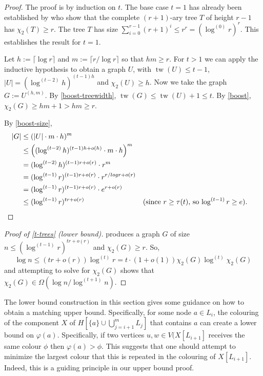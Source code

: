 \documentclass[kpfonts]{patmorin}
\DeclareMathOperator{\tw}{tw}
\newcommand{\trn}{\chi_2}
\theoremstyle{named}
\begin{document}
\begin{proof}
    The proof is by induction on $t$.  The base case $t=1$ has already been established by \citet{karpas.neiman.ea:on} who show that the complete $(r+1)$-ary tree $T$ of height $r-1$ has $\trn(T)\ge r$.  The tree $T$ has size $\sum_{i=0}^{r-1} (r+1)^i \le r^r=(\log^{(0)}r)^{r}$.  This establishes the result for $t=1$.

    Let $h:=\lceil\log r\rceil$ and $m:=\lceil r/\log r\rceil$ so that $hm\ge r$.  For $t>1$ we can apply the inductive hypothesis to obtain a graph $U$,     with $\tw(U)\le t-1$, $|U|=(\log^{(t-2)} h)^{(t-1)h}$ and $\trn(U)\ge h$.
    Now we take the graph $G:=U^{(h,m)}$.  By \cref{boost-treewidth}, $\tw(G)\le \tw(U)+1\le t$.  By \cref{boost},
    $\trn(G)\ge hm+1 > hm \ge r$.

    By \cref{boost-size},
    \begin{align*}
        |G| & \le (|U|\cdot m\cdot h)^{m} \\
        & \le \left((\log^{(t-2)} h)^{(t-1)h + o(h)}\cdot m\cdot h\right)^{m} \\
        & = (\log^{(t-2)} h)^{(t-1)r + o(r)}\cdot r^{m} \\
        & = (\log^{(t-1)} r)^{(t-1)r + o(r)}\cdot r^{r/log r+o(r)} \\
        & = (\log^{(t-1)} r)^{(t-1)r + o(r)}\cdot e^{r+o(r)} \\
        & \le (\log^{(t-1)} r)^{tr + o(r)} & \text{(since $r\ge \tau(t)$, so $\log^{(t-1)} r\ge e$).} & \qedhere
    \end{align*}
\end{proof}

\begin{proof}[Proof of \cref{t-trees} (lower bound)]
     produces a graph $G$ of size $n \le (\log^{(t-1)} r)^{tr+o(r)}$ and $\trn(G)\ge r$.  So,
    \[  \log n \le (tr+o(r))\log^{(t)} r = t\cdot(1+o(1))\trn(G)\log^{(t)} \trn(G)\]
    and attempting to solve for $\trn(G)$ shows that $\trn(G)\in \Omega(\log n/\log^{(t+1)} n)$.
\end{proof}

The lower bound construction in this section gives some guidance on how to obtain a matching upper bound.  Specifically, for some node $a\in L_i$, the colouring of the component $X$ of $H[\{a\}\cup\bigcup_{j=i+1}^m L_j]$ that contains $a$ can create a lower bound on $\varphi(a)$.  Specifically, if two vertices $u,w\in V(X[L_{i+1}]$ receives the same colour $\phi$ then $\varphi(a)>\phi$.  This suggests that one should attempt to minimize the largest colour that this is repeated in the colouring of $X[L_{i+1}]$.  Indeed, this is a guiding principle in our upper bound proof.
\end{document}
